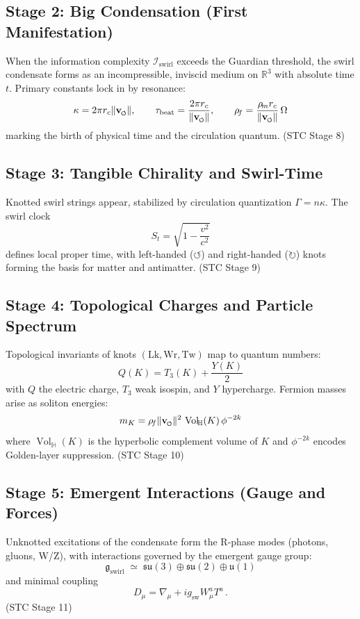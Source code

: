 \documentclass[reprint,aps,onecolumn,nofootinbib]{revtex4-2}
\newcommand{\swirlarrow}{%
    \mathchoice{\mkern-2mu\scriptstyle\boldsymbol{\circlearrowleft}}%
    {\mkern-2mu\scriptstyle\boldsymbol{\circlearrowleft}}%
    {\mkern-2mu\scriptscriptstyle\boldsymbol{\circlearrowleft}}%
    {\mkern-2mu\scriptscriptstyle\boldsymbol{\circlearrowleft}}%
}
\newcommand{\vswirl}{\mathbf{v}_{\swirlarrow}}
\newcommand{\vnorm}{\lVert \vswirl \rVert}               %
\newcommand{\Vol}{\operatorname{Vol}}   %
\begin{document}
\subsection*{Stage 2: Big Condensation (First Manifestation)}
When the information complexity $\mathcal{I}_{\mathrm{swirl}}$ exceeds the Guardian threshold,
the swirl condensate forms as an incompressible, inviscid medium on $\mathbb{R}^3$ with absolute time $t$.
Primary constants lock in by resonance:
\[
\kappa = 2\pi r_c \vnorm,
\qquad
\tau_{\mathrm{beat}} = \frac{2\pi r_c}{\vnorm},
\qquad
\rho_{\!f} = \frac{\rho_{\!m} r_c}{\vnorm}\,\Omega
\]
marking the birth of physical time and the circulation quantum.
\hfill (STC Stage 8)

\subsection*{Stage 3: Tangible Chirality and Swirl-Time}
Knotted swirl strings appear, stabilized by circulation quantization $\Gamma = n\kappa$.
The swirl clock
\[
S_t = \sqrt{1 - \frac{v^{2}}{c^{2}}}
\]
defines local proper time, with left-handed ($\circlearrowleft$) and right-handed ($\circlearrowright$) knots forming the basis for matter and antimatter.
\hfill (STC Stage 9)

\subsection*{Stage 4: Topological Charges and Particle Spectrum}
Topological invariants of knots $(\mathrm{Lk}, \mathrm{Wr}, \mathrm{Tw})$ map to quantum numbers:
\[
Q(K) = T_3(K) + \frac{Y(K)}{2}
\]
with $Q$ the electric charge, $T_3$ weak isospin, and $Y$ hypercharge.
Fermion masses arise as soliton energies:
\[
m_{K} = \rho_{\!f} \vnorm^{2}\, \Vol_{\!\mathbb{H}}(K)\,\phi^{-2k}
\]
where $\Vol_{\!\mathbb{H}}(K)$ is the hyperbolic complement volume of $K$
and $\phi^{-2k}$ encodes Golden-layer suppression.
\hfill (STC Stage 10)

\subsection*{Stage 5: Emergent Interactions (Gauge and Forces)}
Unknotted excitations of the condensate form the R-phase modes (photons, gluons, W/Z),
with interactions governed by the emergent gauge group:
\[
\mathfrak{g}_{\mathrm{swirl}} \;\simeq\;
\mathfrak{su}(3) \oplus \mathfrak{su}(2) \oplus \mathfrak{u}(1)
\]
and minimal coupling
\[
D_\mu = \nabla_\mu + i g_{\mathrm{sw}} W_{\mu}^{a}T^{a}\,.
\]
\hfill (STC Stage 11)
\end{document}
